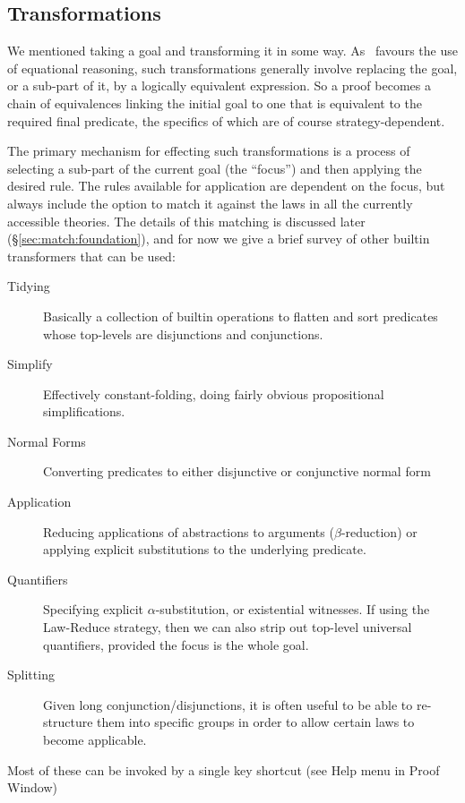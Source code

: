 \subsection{Transformations}

We mentioned taking a goal and transforming it in some way.
As \STHN\ favours the use of equational reasoning,
such transformations generally involve replacing
the goal, or a sub-part of it, by a logically equivalent expression.
So a proof becomes a chain of equivalences linking the
initial goal to one that is equivalent to the required final predicate,
the specifics of which are of course strategy-dependent.

The primary mechanism for effecting such transformations
is a process of selecting a sub-part of the current goal (the ``focus'')
and then applying the desired rule.
The rules available for application are dependent on the focus,
but always include the option to match it against the laws
in all the currently accessible theories.
The details of this matching is discussed later (\S\ref{sec:match:foundation}),
and for now we give a brief survey of other builtin transformers that can be used:
\begin{description}
  \item[Tidying]
    Basically a collection of builtin operations to flatten and sort
    predicates whose top-levels are disjunctions and conjunctions.
  \item[Simplify]
    Effectively constant-folding, doing fairly obvious propositional simplifications.
  \item[Normal Forms]
    Converting predicates to either disjunctive or conjunctive normal form
  \item[Application]
    Reducing applications of abstractions to arguments ($\beta$-reduction)
    or applying explicit substitutions to the underlying predicate.
  \item[Quantifiers]
    Specifying explicit $\alpha$-substitution, or existential witnesses.
    If using the Law-Reduce strategy, then we can also strip out top-level
    universal quantifiers, provided the focus is the whole goal.
  \item[Splitting]
    Given long conjunction/disjunctions,
    it is often useful to be able to re-structure them into
    specific groups in order to allow certain laws to become applicable.
\end{description}
Most of these can be invoked by a single key shortcut (see Help menu in Proof Window)

